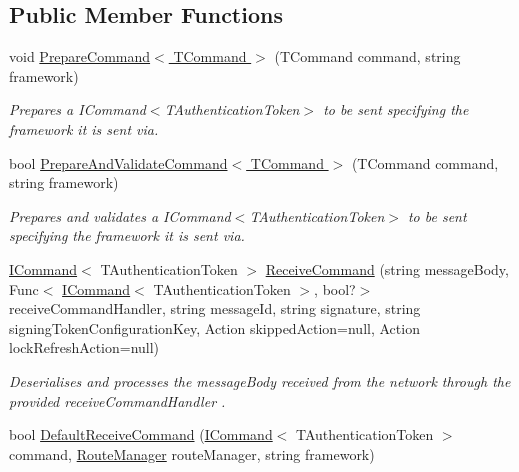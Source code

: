 \subsection*{Public Member Functions}
\begin{DoxyCompactItemize}
\item 
void \hyperlink{interfaceCqrs_1_1Azure_1_1ServiceBus_1_1IAzureBusHelper_ad25c4130a4357504cfccba49999493c7_ad25c4130a4357504cfccba49999493c7}{Prepare\+Command$<$ T\+Command $>$} (T\+Command command, string framework)
\begin{DoxyCompactList}\small\item\em Prepares a I\+Command$<$\+T\+Authentication\+Token$>$ to be sent specifying the framework it is sent via. \end{DoxyCompactList}\item 
bool \hyperlink{interfaceCqrs_1_1Azure_1_1ServiceBus_1_1IAzureBusHelper_a283ee2cf9241a5364dd5569a9f12fa10_a283ee2cf9241a5364dd5569a9f12fa10}{Prepare\+And\+Validate\+Command$<$ T\+Command $>$} (T\+Command command, string framework)
\begin{DoxyCompactList}\small\item\em Prepares and validates a I\+Command$<$\+T\+Authentication\+Token$>$ to be sent specifying the framework it is sent via. \end{DoxyCompactList}\item 
\hyperlink{interfaceCqrs_1_1Commands_1_1ICommand}{I\+Command}$<$ T\+Authentication\+Token $>$ \hyperlink{interfaceCqrs_1_1Azure_1_1ServiceBus_1_1IAzureBusHelper_ac68564203a196da2eb860e9cc11f8f4d_ac68564203a196da2eb860e9cc11f8f4d}{Receive\+Command} (string message\+Body, Func$<$ \hyperlink{interfaceCqrs_1_1Commands_1_1ICommand}{I\+Command}$<$ T\+Authentication\+Token $>$, bool?$>$ receive\+Command\+Handler, string message\+Id, string signature, string signing\+Token\+Configuration\+Key, Action skipped\+Action=null, Action lock\+Refresh\+Action=null)
\begin{DoxyCompactList}\small\item\em Deserialises and processes the {\itshape message\+Body}  received from the network through the provided {\itshape receive\+Command\+Handler} . \end{DoxyCompactList}\item 
bool \hyperlink{interfaceCqrs_1_1Azure_1_1ServiceBus_1_1IAzureBusHelper_a3c632e92e0e38110f9e7721fb31700d1_a3c632e92e0e38110f9e7721fb31700d1}{Default\+Receive\+Command} (\hyperlink{interfaceCqrs_1_1Commands_1_1ICommand}{I\+Command}$<$ T\+Authentication\+Token $>$ command, \hyperlink{classCqrs_1_1Bus_1_1RouteManager}{Route\+Manager} route\+Manager, string framework)

\end{DoxyCompactItemize}
